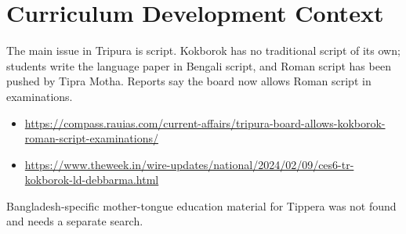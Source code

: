 \documentclass[12pt]{article}
\begin{document}
\section{Curriculum Development Context}
The main issue in Tripura is script. Kokborok has no traditional script of its own; students write the language paper in Bengali script, and Roman script has been pushed by Tipra Motha. Reports say the board now allows Roman script in examinations.
\begin{itemize}
\item \url{https://compass.rauias.com/current-affairs/tripura-board-allows-kokborok-roman-script-examinations/}
\item \url{https://www.theweek.in/wire-updates/national/2024/02/09/ces6-tr-kokborok-ld-debbarma.html}
\end{itemize}
Bangladesh-specific mother-tongue education material for Tippera was not found and needs a separate search.
\end{document}
